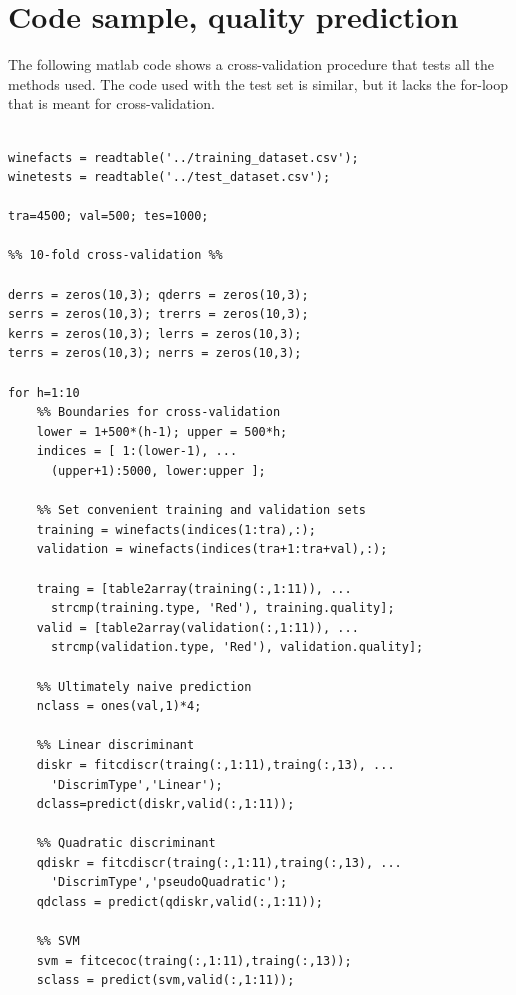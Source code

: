 \documentclass[twoside]{article}
\begin{document}
\begin{multicols}{2}
{\begin{verbatim}
\end{verbatim}

}

\section{Code sample, quality prediction}\label{appendix:qualitycode}

The following matlab code shows a cross-validation procedure
that tests all the methods used. The code used with the test
set is similar, but it lacks the for-loop that is meant for 
cross-validation.

{\footnotesize

\begin{verbatim}

winefacts = readtable('../training_dataset.csv');
winetests = readtable('../test_dataset.csv');

tra=4500; val=500; tes=1000;

%% 10-fold cross-validation %%

derrs = zeros(10,3); qderrs = zeros(10,3); 
serrs = zeros(10,3); trerrs = zeros(10,3); 
kerrs = zeros(10,3); lerrs = zeros(10,3); 
terrs = zeros(10,3); nerrs = zeros(10,3);

for h=1:10
    %% Boundaries for cross-validation
    lower = 1+500*(h-1); upper = 500*h;
    indices = [ 1:(lower-1), ... 
      (upper+1):5000, lower:upper ];

    %% Set convenient training and validation sets
    training = winefacts(indices(1:tra),:);
    validation = winefacts(indices(tra+1:tra+val),:);

    traing = [table2array(training(:,1:11)), ... 
      strcmp(training.type, 'Red'), training.quality];
    valid = [table2array(validation(:,1:11)), ...
      strcmp(validation.type, 'Red'), validation.quality];

    %% Ultimately naive prediction
    nclass = ones(val,1)*4;
    
    %% Linear discriminant
    diskr = fitcdiscr(traing(:,1:11),traing(:,13), ...
      'DiscrimType','Linear');
    dclass=predict(diskr,valid(:,1:11));

    %% Quadratic discriminant
    qdiskr = fitcdiscr(traing(:,1:11),traing(:,13), ...
      'DiscrimType','pseudoQuadratic');
    qdclass = predict(qdiskr,valid(:,1:11));
    
    %% SVM
    svm = fitcecoc(traing(:,1:11),traing(:,13));
    sclass = predict(svm,valid(:,1:11));
    

\end{verbatim}}
\end{multicols}
\end{document}
